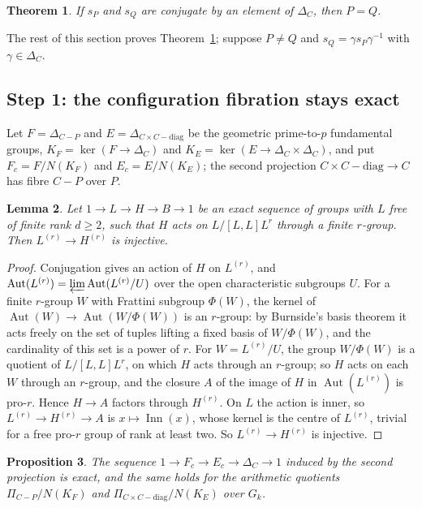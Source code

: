 \documentclass[11pt]{amsart}
\newtheorem{thm}{Theorem}[section]
\newtheorem{lemma}[thm]{Lemma}
\newtheorem{proposition}[thm]{Proposition}
\theoremstyle{remark}
\DeclareMathOperator{\Inn}{Inn}
\DeclareMathOperator{\Aut}{Aut}
\begin{document}
\begin{thm}\label{thm:finite}
If $s_P$ and $s_Q$ are conjugate by an element of $\Delta_C$, then $P=Q$.
\end{thm}

The rest of this section proves Theorem~\ref{thm:finite}; suppose $P\ne Q$ and $s_Q=\gamma s_P\gamma^{-1}$ with $\gamma\in\Delta_C$.

\subsection{Step 1: the configuration fibration stays exact}
Let $F=\Delta_{C-P}$ and $E=\Delta_{C\times C-\mathrm{diag}}$ be the geometric prime-to-$p$ fundamental groups, $K_F=\ker(F\to\Delta_C)$ and $K_E=\ker(E\to\Delta_C\times\Delta_C)$, and put $F_c=F/N(K_F)$ and $E_c=E/N(K_E)$; the second projection $C\times C-\mathrm{diag}\to C$ has fibre $C-P$ over $P$.

\begin{lemma}\label{lem:free}
Let $1\to L\to H\to B\to1$ be an exact sequence of groups with $L$ free of finite rank $d\ge2$, such that $H$ acts on $L/[L,L]L^r$ through a finite $r$-group. Then $L^{(r)}\to H^{(r)}$ is injective.
\end{lemma}

\begin{proof}
Conjugation gives an action of $H$ on $L^{(r)}$, and $\Aut(L^{(r)})=\varprojlim\Aut(L^{(r)}/U)$ over the open characteristic subgroups $U$. For a finite $r$-group $W$ with Frattini subgroup $\Phi(W)$, the kernel of $\Aut(W)\to\Aut(W/\Phi(W))$ is an $r$-group: by Burnside's basis theorem it acts freely on the set of tuples lifting a fixed basis of $W/\Phi(W)$, and the cardinality of this set is a power of $r$. For $W=L^{(r)}/U$, the group $W/\Phi(W)$ is a quotient of $L/[L,L]L^r$, on which $H$ acts through an $r$-group; so $H$ acts on each $W$ through an $r$-group, and the closure $A$ of the image of $H$ in $\Aut(L^{(r)})$ is pro-$r$. Hence $H\to A$ factors through $H^{(r)}$. On $L$ the action is inner, so $L^{(r)}\to H^{(r)}\to A$ is $x\mapsto\Inn(x)$, whose kernel is the centre of $L^{(r)}$, trivial for a free pro-$r$ group of rank at least two. So $L^{(r)}\to H^{(r)}$ is injective.
\end{proof}

\begin{proposition}\label{prop:exact}
The sequence $1\to F_c\to E_c\to\Delta_C\to1$ induced by the second projection is exact, and the same holds for the arithmetic quotients $\Pi_{C-P}/N(K_F)$ and $\Pi_{C\times C-\mathrm{diag}}/N(K_E)$ over $G_k$.
\end{proposition}
\end{document}
